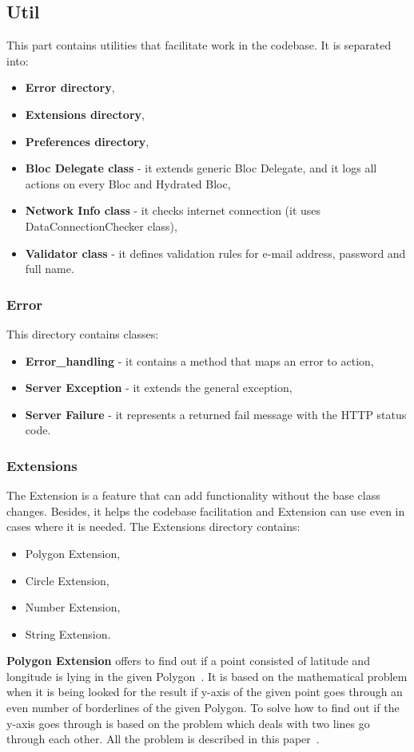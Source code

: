 \subsection{Util}\label{subsec:util}
This part contains utilities that facilitate work in the codebase.
It is separated into:
\begin{itemize}
    \item \textbf{Error directory},
    \item \textbf{Extensions directory},
    \item \textbf{Preferences directory},
    \item \textbf{Bloc Delegate class} - it extends generic Bloc Delegate, and it logs all actions on every Bloc and Hydrated Bloc,
    \item \textbf{Network Info class} - it checks internet connection (it uses DataConnectionChecker class),
    \item \textbf{Validator class} - it defines validation rules for e-mail address, password and full name.
\end{itemize}


\subsubsection{Error}\label{subsubsec:error}
This directory contains classes:
\begin{itemize}
    \item \textbf{Error\_handling} - it contains a method that maps an error to action,
    \item \textbf{Server Exception} - it extends the general exception,
    \item \textbf{Server Failure} - it represents a returned fail message with the HTTP status code.
\end{itemize}


\subsubsection{Extensions}\label{subsubsec:extensions}
The Extension is a feature that can add functionality without the base class changes.
Besides, it helps the codebase facilitation and Extension can use even in cases where it is needed.
The Extensions directory contains:
\begin{itemize}
    \item Polygon Extension,
    \item Circle Extension,
    \item Number Extension,
    \item String Extension.
\end{itemize}
\textbf{Polygon Extension} offers to find out if a point consisted of latitude and longitude is lying in the given Polygon~\cite{googleMapsPolygon}.
It is based on the mathematical problem when it is being looked for the result if y-axis of the given point goes through an even number of borderlines of the given Polygon.
To solve how to find out if the y-axis goes through is based on the problem which deals with two lines go through each other.
All the problem is described in this paper~\cite{geometricAlgorithms}.

